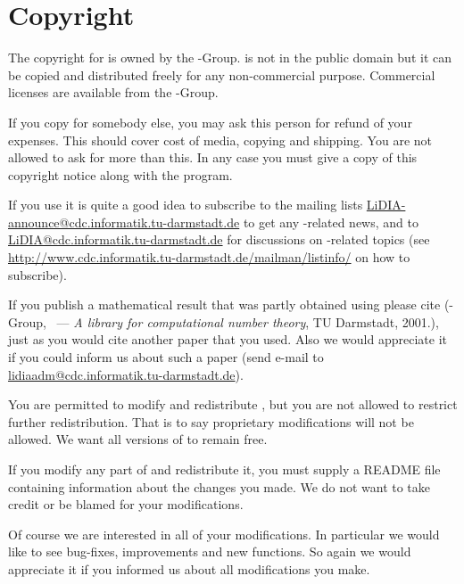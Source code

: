 
\chapter*{Copyright}
\label{chap:copyright}

The copyright for \LiDIA is owned by the \LiDIA-Group.  \LiDIA is not in the public domain but
it can be copied and distributed freely for any non-commercial purpose.  Commercial licenses are
available from the \LiDIA-Group.

If you copy \LiDIA for somebody else, you may ask this person for refund of your expenses.  This
should cover cost of media, copying and shipping.  You are not allowed to ask for more than this.
In any case you must give a copy of this copyright notice along with the program.

If you use \LiDIA it is quite a good idea to subscribe to the mailing lists
\url{LiDIA-announce@cdc.informatik.tu-darmstadt.de} to get any \LiDIA-related news, and to
\url{LiDIA@cdc.informatik.tu-darmstadt.de} for discussions on \LiDIA-related topics (see
\url{http://www.cdc.informatik.tu-darmstadt.de/mailman/listinfo/} on how to subscribe).

If you publish a mathematical result that was partly obtained using \LiDIA please cite \LiDIA
(\LiDIA-Group, \LiDIA\ --- \emph{A library for computational number theory}, TU Darmstadt,
2001.), just as you would cite another paper that you used.  Also we would appreciate it if you
could inform us about such a paper (send e-mail to
\url{lidiaadm@cdc.informatik.tu-darmstadt.de}).

You are permitted to modify and redistribute \LiDIA, but you are not allowed to restrict further
redistribution.  That is to say proprietary modifications will not be allowed.  We want all
versions of \LiDIA to remain free.

If you modify any part of \LiDIA and redistribute it, you must supply a README file containing
information about the changes you made.  We do not want to take credit or be blamed for your
modifications.

Of course we are interested in all of your modifications.  In particular we would like to see
bug-fixes, improvements and new functions.  So again we would appreciate it if you informed us
about all modifications you make.

